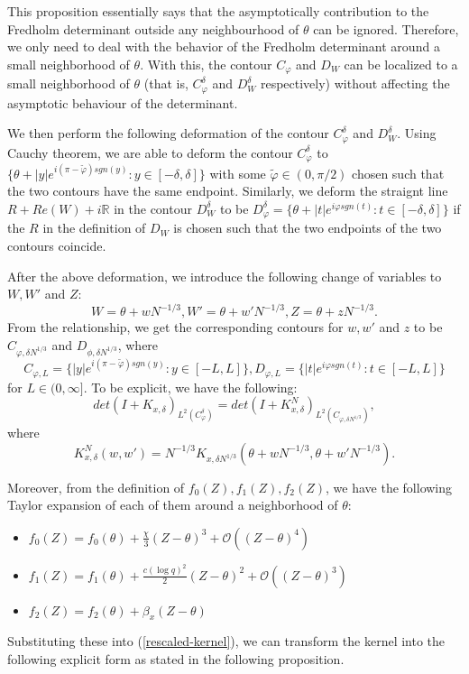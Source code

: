 This proposition essentially says that the asymptotically contribution to the Fredholm determinant outside any neighbourhood of $\theta$ can be ignored. Therefore, we only need to deal with the behavior of the Fredholm determinant around a small neighborhood of $\theta$. With this, the contour $C_{\varphi}$ and $D_{W}$ can be localized to a small neighborhood of $\theta$ (that is, $C_{\varphi}^{\delta}$ and $D_{W}^{\delta}$ respectively) without affecting the asymptotic behaviour of the determinant.

We then perform the following deformation of the contour $C_{\varphi}^{\delta}$ and $D_W^{\delta}$. Using Cauchy theorem, we are able to deform the contour $C_{\varphi}^{\delta}$ to $\{\theta + |y|e^{i(\pi - \tilde{\varphi}) sgn(y)}: y \in [-\delta, \delta]\}$ with some $\tilde{\varphi} \in (0, \pi / 2)$ chosen such that the two contours have the same endpoint. Similarly, we deform the straignt line $R+Re(W) + i \mathbb{R}$ in the contour $D_W^{\delta}$ to be $D_{\varphi}^{\delta} = \{\theta + |t| e^{i \varphi sgn(t)}: t \in [-\delta, \delta] \}$ if the $R$ in the definition of $D_W$ is chosen such that the two endpoints of the two contours coincide. 

After the above deformation, we introduce the following change of variables to $W, W'$ and $Z$: $$W = \theta + wN^{-1/3}, W' = \theta + w' N^{-1/3}, Z = \theta + zN^{-1/3}.$$ From the relationship, we get the corresponding contours for $w, w'$ and $z$ to be $C_{\varphi,\delta N^{1/3}}$ and $D_{\phi, \delta N^{1/3}}$, where
$$C_{\varphi,L} = \{|y|e^{i(\pi - \tilde{\varphi}) sgn(y)}: y \in [-L, L]\}, D_{\varphi, L} = \{|t| e^{i \varphi sgn(t)}: t \in [-L, L]\}$$ for $L \in (0, \infty].$ To be explicit, we have the following: $$det(I+K_{x, \delta})_{L^2(C_{\varphi}^{\delta})} = det(I +K_{x, \delta}^N )_{L^2(C_{\varphi, \delta N^{1/3}})},$$ where 
\begin{equation}
\label{rescaled-kernel}
K_{x, \delta}^N(w,w') = N^{-1/3} K_{x, \delta N^{1/3}} (\theta + wN^{-1/3}, \theta + w'N^{-1/3}).
\end{equation}

Moreover, from the definition of $f_0(Z), f_1(Z), f_2(Z)$, we have the following Taylor expansion of each of them around a neighborhood of $\theta$:
\begin{itemize}
\item $f_0(Z) = f_0(\theta) + \frac{\chi}{3} (Z - \theta)^3 + \mathcal{O}((Z - \theta)^4)$
\item $f_1(Z) = f_1(\theta) + \frac{c(\log q)^2}{2} (Z - \theta)^2 + \mathcal{O}((Z - \theta)^3)$
\item $f_2(Z) = f_2(\theta) + \beta_x (Z - \theta)$
\end{itemize}
Substituting these into (\ref{rescaled-kernel}), we can transform the kernel into the following explicit form as stated in the following proposition.

